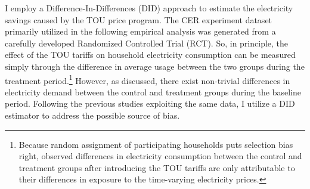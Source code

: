 I employ a Difference-In-Differences (DID) approach to estimate the electricity savings caused by the TOU price program. The CER experiment dataset primarily utilized in the following empirical analysis was generated from a carefully developed Randomized Controlled Trial (RCT). So, in principle, the effect of the TOU tariffs on household electricity consumption can be measured simply through the difference in average usage between the two groups during the treatment period.\footnote{Because random assignment of participating households puts selection bias right, observed differences in electricity consumption between the control and treatment groups after introducing the TOU tariffs are only attributable to their differences in exposure to the time-varying electricity prices.} However, as discussed, there exist non-trivial differences in electricity demand between the control and treatment groups during the baseline period. Following the previous studies exploiting the same data, I utilize a DID estimator to address the possible source of bias. 


